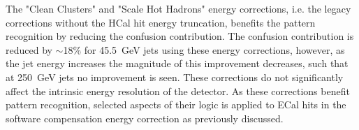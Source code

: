 The "Clean Clusters" and "Scale Hot Hadrons" energy corrections, i.e. the legacy corrections without the HCal hit energy truncation, benefits the pattern recognition by reducing the confusion contribution.  The confusion contribution is reduced by $\sim$18\% for 45.5~GeV jets using these energy corrections, however, as the jet energy increases the magnitude of this improvement decreases, such that at 250~GeV jets no improvement is seen.  These corrections do not significantly affect the intrinsic energy resolution of the detector.  As these corrections benefit pattern recognition, selected aspects of their logic is applied to ECal hits in the software compensation energy correction as previously discussed.

\begin{figure}[h!]

\end{figure}
